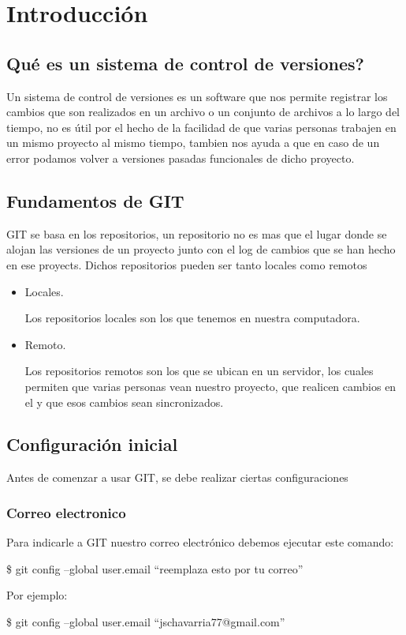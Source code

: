 \section{Introducci\'on}
    \subsection{Qu\'e es un sistema de control de versiones?}
        Un sistema de control de versiones es un software que nos permite registrar los cambios que son realizados en un archivo o un conjunto de archivos a lo largo del tiempo, no es \'util por el hecho de la facilidad de que varias personas trabajen en un mismo proyecto al mismo tiempo, tambien nos ayuda a que en caso de un error podamos volver a versiones pasadas funcionales de dicho proyecto.
    \subsection{Fundamentos de GIT}
        GIT se basa en los repositorios, un repositorio no es mas que el lugar donde se alojan las versiones de un proyecto junto con el log de cambios que se han hecho en ese proyects.
        Dichos repositorios pueden ser tanto locales como remotos
            \begin{itemize}
                \item Locales.

                    Los repositorios locales son los que tenemos en nuestra computadora.

                \item Remoto.

                    Los repositorios remotos son los que se ubican en un servidor, los cuales permiten que varias personas vean nuestro proyecto, que realicen cambios en el y que esos cambios sean sincronizados.
            \end{itemize}
    \subsection{Configuraci\'on inicial}
            Antes de comenzar a usar GIT, se debe realizar ciertas configuraciones
            \subsubsection{Correo electronico}
                Para indicarle a GIT nuestro correo electr\'onico debemos ejecutar este comando:
                    \begin{lstlistings}
                        \$ git config --global user.email ``reemplaza esto por tu correo''
                    \end{lstlistings}
                    Por ejemplo:
                    \begin{lstlistings}
                        \$ git config --global user.email ``jschavarria77@gmail.com''
                    \end{lstlistings}
